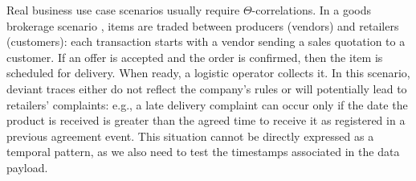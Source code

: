 Real business use case scenarios usually require $\Theta$-correlations. In a goods brokerage scenario \cite{PetermannJMR14},  items are traded between producers (vendors) and retailers (customers): each transaction starts with a vendor sending a sales quotation to a customer. If an offer is accepted and the order is confirmed, then the item is scheduled for delivery. When ready, a logistic operator collects it. %
In this scenario, deviant traces %
either do not reflect the company's rules or %
will potentially lead to retailers' complaints: %
e.g., %
a late delivery complaint can occur only if the date the product is received is greater than the agreed time to receive it as registered in a previous agreement event. This situation cannot be directly expressed as a temporal pattern, as we also need to test the timestamps associated in the data payload. %
%
